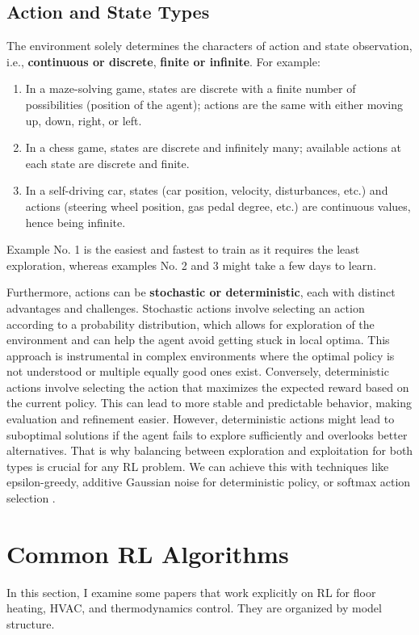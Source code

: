 \documentclass[../main.tex]{subfiles}
\begin{document}
\subsection{Action and State Types}
The environment solely determines the characters of action and state observation, i.e., \textbf{continuous or discrete}, \textbf{finite or infinite}. For example:
\begin{enumerate}
    \item In a maze-solving game, states are discrete with a finite number of possibilities (position of the agent); actions are the same with either moving up, down, right, or left.
    \item In a chess game, states are discrete and infinitely many; available actions at each state are discrete and finite.
    \item In a self-driving car, states (car position, velocity, disturbances, etc.) and actions (steering wheel position, gas pedal degree, etc.) are continuous values, hence being infinite. 
\end{enumerate}
Example No. 1 is the easiest and fastest to train as it requires the least exploration, whereas examples No. 2 and 3 might take a few days to learn.

Furthermore, actions can be \textbf{stochastic or deterministic}, each with distinct advantages and challenges. Stochastic actions involve selecting an action according to a probability distribution, which allows for exploration of the environment and can help the agent avoid getting stuck in local optima. This approach is instrumental in complex environments where the optimal policy is not understood or multiple equally good ones exist. Conversely, deterministic actions involve selecting the action that maximizes the expected reward based on the current policy. This can lead to more stable and predictable behavior, making evaluation and refinement easier. However, deterministic actions might lead to suboptimal solutions if the agent fails to explore sufficiently and overlooks better alternatives. That is why balancing between exploration and exploitation for both types is crucial for any RL problem. We can achieve this with techniques like epsilon-greedy, additive Gaussian noise for deterministic policy, or softmax action selection \cite{rlbible_multibandit}.


\section{Common RL Algorithms} \label{sec:rlagents}
In this section, I examine some papers that work explicitly on RL for floor heating, HVAC, and thermodynamics control. They are organized by model structure.
\end{document}

